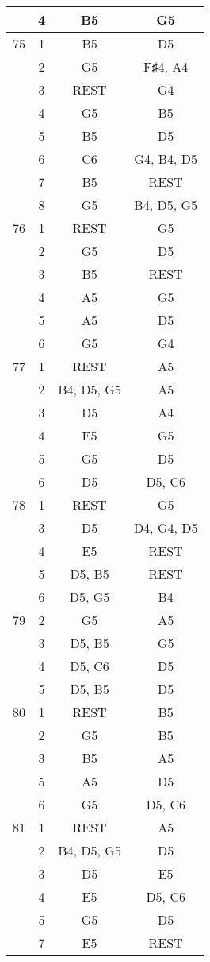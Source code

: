 \documentclass{article}
\begin{document}
\begin{longtable}{|c|c|c|c|}
  & 4 & B5 & G5 \\ 
\hline
75 & 1 & B5 & D5 \\ 
  & 2 & G5 & F♯4, A4 \\ 
  & 3 & REST & G4 \\ 
  & 4 & G5 & B5 \\ 
  & 5 & B5 & D5 \\ 
  & 6 & C6 & G4, B4, D5 \\ 
  & 7 & B5 & REST \\ 
  & 8 & G5 & B4, D5, G5 \\ 
\hline
76 & 1 & REST & G5 \\ 
  & 2 & G5 & D5 \\ 
  & 3 & B5 & REST \\ 
  & 4 & A5 & G5 \\ 
  & 5 & A5 & D5 \\ 
  & 6 & G5 & G4 \\ 
\hline
77 & 1 & REST & A5 \\ 
  & 2 & B4, D5, G5 & A5 \\ 
  & 3 & D5 & A4 \\ 
  & 4 & E5 & G5 \\ 
  & 5 & G5 & D5 \\ 
  & 6 & D5 & D5, C6 \\ 
\hline
78 & 1 & REST & G5 \\ 
  & 3 & D5 & D4, G4, D5 \\ 
  & 4 & E5 & REST \\ 
  & 5 & D5, B5 & REST \\ 
  & 6 & D5, G5 & B4 \\ 
\hline
79 & 2 & G5 & A5 \\ 
  & 3 & D5, B5 & G5 \\ 
  & 4 & D5, C6 & D5 \\ 
  & 5 & D5, B5 & D5 \\ 
\hline
80 & 1 & REST & B5 \\ 
  & 2 & G5 & B5 \\ 
  & 3 & B5 & A5 \\ 
  & 5 & A5 & D5 \\ 
  & 6 & G5 & D5, C6 \\ 
\hline
81 & 1 & REST & A5 \\ 
  & 2 & B4, D5, G5 & D5 \\ 
  & 3 & D5 & E5 \\ 
  & 4 & E5 & D5, C6 \\ 
  & 5 & G5 & D5 \\ 
  & 7 & E5 & REST \\ 

\end{longtable}
\end{document}
